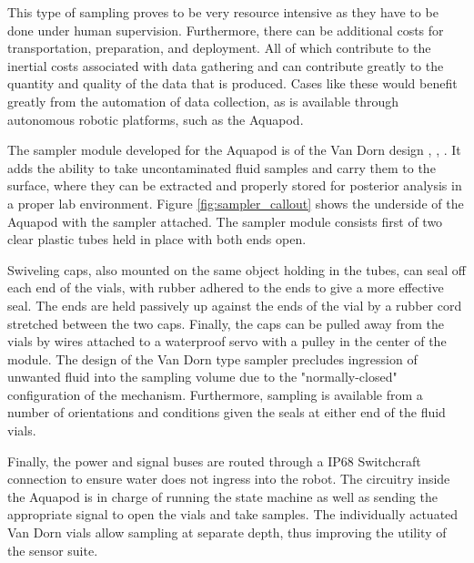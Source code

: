 This type of sampling proves to be very resource intensive as they have to be
done under human supervision. Furthermore, there can be additional costs for
transportation, preparation, and deployment. All of which contribute to the
inertial costs associated with data gathering and can contribute greatly to the
quantity and quality of the data that is produced. Cases like these would
benefit greatly from the automation of data collection, as is available through
autonomous robotic platforms, such as the Aquapod.

The sampler module developed for the Aquapod is of the Van Dorn design
\cite{Robertson1968}, \cite{Villar-Argaiz2001}, \cite{Biggs2012}.   It adds the
ability to take uncontaminated fluid samples and carry them to the surface,
where they can be extracted and properly stored for posterior analysis in a
proper lab environment. Figure \ref{fig:sampler_callout} shows the underside of the
Aquapod with the sampler attached.  The sampler module consists first of two
clear plastic tubes held in place with both ends open.

Swiveling caps, also mounted on the same object holding in the tubes, can seal
off each end of the vials, with rubber adhered to the ends to give a more
effective seal.  The ends are held passively up against the ends of the vial by
a rubber cord stretched between the two caps.  Finally, the caps can be pulled
away from the vials by wires attached to a waterproof servo with a pulley in the
center of the module.  The design of the Van Dorn type sampler precludes
ingression of unwanted fluid into the sampling volume due to the
"normally-closed" configuration of the mechanism. Furthermore, sampling is
available from a number of orientations and conditions given the seals at either
end of the fluid vials.

Finally, the power and signal buses are routed through a IP68 Switchcraft
connection to ensure water does not ingress into the robot.  The circuitry
inside the Aquapod is in charge of running the state machine as well as sending
the appropriate signal to open the vials and take samples. The individually
actuated Van Dorn vials allow sampling at separate depth, thus improving the
utility of the sensor suite.

